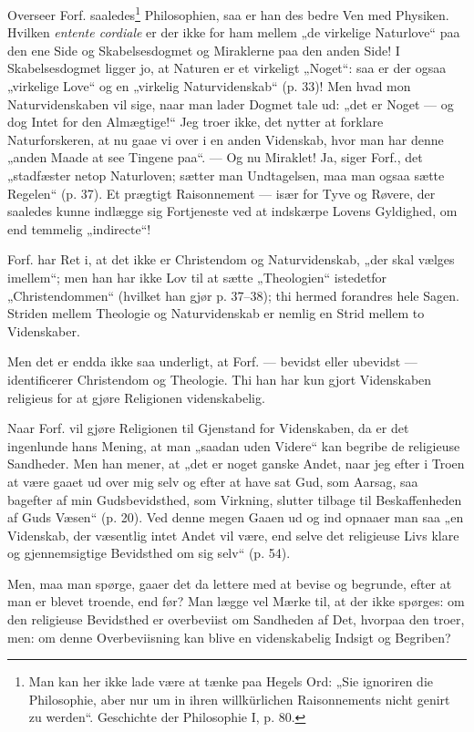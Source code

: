 \documentclass[12pt,a4paper]{book}
\newcommand{\opage}[1]{\marginnote{\footnotesize\textit{[#1]}}}
\begin{document}
Overseer Forf. saaledes\footnote{Man kan her ikke lade være at tænke paa Hegels Ord: „Sie ignoriren die Philosophie, aber nur um in ihren willkürlichen Raisonnements nicht genirt zu werden“. Geschichte der Philosophie I, p. 80.} Philosophien, saa er han
des bedre Ven med Physiken. Hvilken \textit{entente cordiale} er
der ikke for ham mellem „de virkelige Naturlove“ paa den
ene Side og Skabelsesdogmet og Miraklerne paa den anden
Side! I Skabelsesdogmet ligger jo, at Naturen er et virkeligt
„Noget“: saa er der ogsaa „virkelige Love“ og en „virkelig
Naturvidenskab“ (p. 33)! Men hvad mon Naturvidenskaben
\opage{8}\setcounter{footnote}{0}%
vil sige, naar man lader Dogmet tale ud: „det er Noget ---
og dog Intet for den Almægtige!“ Jeg troer ikke, det nytter
at forklare Naturforskeren, at nu gaae vi over i en anden
Videnskab, hvor man har denne „anden Maade at see Tingene
paa“. --- Og nu Miraklet! Ja, siger Forf., det „stadfæster
netop Naturloven; sætter man Undtagelsen, maa man ogsaa
sætte Regelen“ (p. 37). Et prægtigt Raisonnement --- især
for Tyve og Røvere, der saaledes kunne indlægge sig Fortjeneste
ved at indskærpe Lovens Gyldighed, om end temmelig
„indirecte“!

Forf. har Ret i, at det ikke er Christendom og Naturvidenskab,
„der skal vælges imellem“; men han har ikke Lov
til at sætte „Theologien“ istedetfor „Christendommen“ (hvilket
han gjør p. 37--38); thi hermed forandres hele Sagen.
Striden mellem Theologie og Naturvidenskab er nemlig en
Strid mellem to Videnskaber.

Men det er endda ikke saa underligt, at Forf. --- bevidst
eller ubevidst --- identificerer Christendom og Theologie. Thi
han har kun gjort Videnskaben religieus for at gjøre Religionen
videnskabelig.

Naar Forf. vil gjøre Religionen til Gjenstand for Videnskaben,
da er det ingenlunde hans Mening, at man „saadan
uden Videre“ kan begribe de religieuse Sandheder. Men han
mener, at „det er noget ganske Andet, naar jeg efter i Troen
at være gaaet ud over mig selv og efter at have sat Gud,
som Aarsag, saa bagefter af min Gudsbevidsthed, som Virkning,
slutter tilbage til Beskaffenheden af Guds Væsen“ (p. 20).
Ved denne megen Gaaen ud og ind opnaaer man saa „en
Videnskab, der væsentlig intet Andet vil være, end selve det
religieuse Livs klare og gjennemsigtige Bevidsthed om sig
selv“ (p. 54).

Men, maa man spørge, gaaer det da lettere med at bevise
og begrunde, efter at man er blevet troende, end før?
Man lægge vel Mærke til, at der ikke spørges: om den
\opage{9}\setcounter{footnote}{0}%
religieuse Bevidsthed er overbeviist om Sandheden af Det,
hvorpaa den troer, men: om denne Overbeviisning kan blive
en videnskabelig Indsigt og Begriben?
\end{document}

